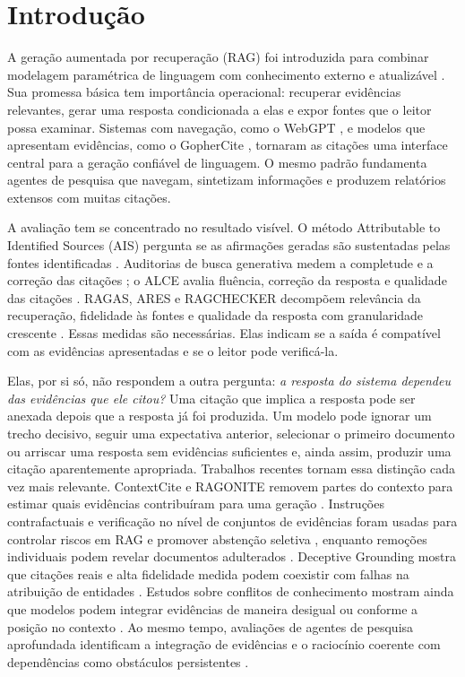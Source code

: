 \documentclass[10pt,twocolumn]{article}
\begin{document}
\section{Introdução}

A geração aumentada por recuperação (RAG) foi introduzida para combinar modelagem paramétrica de linguagem com conhecimento externo e atualizável \citep{lewis2020rag}. Sua promessa básica tem importância operacional: recuperar evidências relevantes, gerar uma resposta condicionada a elas e expor fontes que o leitor possa examinar. Sistemas com navegação, como o WebGPT \citep{nakano2021webgpt}, e modelos que apresentam evidências, como o GopherCite \citep{menick2022verified}, tornaram as citações uma interface central para a geração confiável de linguagem. O mesmo padrão fundamenta agentes de pesquisa que navegam, sintetizam informações e produzem relatórios extensos com muitas citações.

A avaliação tem se concentrado no resultado visível. O método Attributable to Identified Sources (AIS) pergunta se as afirmações geradas são sustentadas pelas fontes identificadas \citep{rashkin2021ais}. Auditorias de busca generativa medem a completude e a correção das citações \citep{liu2023verifiability}; o ALCE avalia fluência, correção da resposta e qualidade das citações \citep{gao2023alce}. RAGAS, ARES e RAGCHECKER decompõem relevância da recuperação, fidelidade às fontes e qualidade da resposta com granularidade crescente \citep{es2023ragas,saadfalcon2023ares,ru2024ragchecker}. Essas medidas são necessárias. Elas indicam se a saída é compatível com as evidências apresentadas e se o leitor pode verificá-la.

Elas, por si só, não respondem a outra pergunta: \emph{a resposta do sistema dependeu das evidências que ele citou?} Uma citação que implica a resposta pode ser anexada depois que a resposta já foi produzida. Um modelo pode ignorar um trecho decisivo, seguir uma expectativa anterior, selecionar o primeiro documento ou arriscar uma resposta sem evidências suficientes e, ainda assim, produzir uma citação aparentemente apropriada. Trabalhos recentes tornam essa distinção cada vez mais relevante. ContextCite e RAGONITE removem partes do contexto para estimar quais evidências contribuíram para uma geração \citep{cohenwang2024contextcite,saharoy2024ragonite}. Instruções contrafactuais e verificação no nível de conjuntos de evidências foram usadas para controlar riscos em RAG e promover abstenção seletiva \citep{chen2024risk,qiu2026surerag}, enquanto remoções individuais podem revelar documentos adulterados \citep{kumar2026raguard}. Deceptive Grounding mostra que citações reais e alta fidelidade medida podem coexistir com falhas na atribuição de entidades \citep{caruzzo2026deceptive}. Estudos sobre conflitos de conhecimento mostram ainda que modelos podem integrar evidências de maneira desigual ou conforme a posição no contexto \citep{xu2024knowledge,yang2026contextconflict}. Ao mesmo tempo, avaliações de agentes de pesquisa aprofundada identificam a integração de evidências e o raciocínio coerente com dependências como obstáculos persistentes \citep{zhang2025finder,guo2026mrlhdr}.
\end{document}
